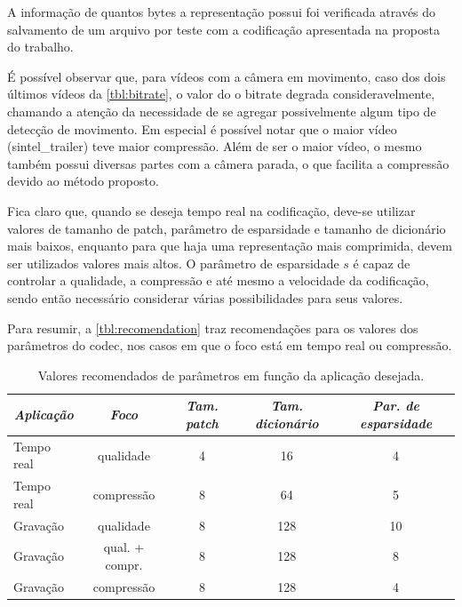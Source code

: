 \documentclass[cic,tc]{iiufrgs}
\begin{document}
A informação de quantos bytes a representação possui foi verificada através do salvamento
de um arquivo por teste com a codificação apresentada na proposta do trabalho.

É possível observar que, para vídeos com a câmera em movimento, caso dos dois últimos vídeos da \autoref{tbl:bitrate}, 
o valor do
o bitrate degrada consideravelmente, chamando a atenção da necessidade de se agregar possivelmente
algum tipo de detecção de movimento.
Em especial é possível notar que o maior vídeo (sintel\_trailer) teve maior compressão.
Além de ser o maior vídeo, o mesmo também possui diversas partes com a câmera parada, 
o que facilita a compressão devido ao método proposto.

Fica claro que, quando se deseja tempo real na codificação, deve-se utilizar valores 
de tamanho de patch, parâmetro de esparsidade e tamanho de dicionário mais baixos, enquanto para 
que haja uma representação mais comprimida, 
devem ser utilizados valores mais altos.
O parâmetro de esparsidade $s$ é capaz de controlar a qualidade, a compressão e até mesmo a velocidade 
da codificação, sendo então necessário considerar várias possibilidades para seus valores.

Para resumir, a \autoref{tbl:recomendation} traz recomendações para os valores dos parâmetros do codec, 
nos casos em que o foco está em tempo real ou compressão.

\begin{table}[h]
    \caption{Valores recomendados de parâmetros em função da aplicação desejada.}
    \centering
    \begin{tabular}{|l|c|c|c|c|}
        \hline
        \multicolumn{1}{|c|}{\emph{Aplicação}} & 
        \emph{Foco} & 
        \emph{Tam. patch} & 
        \emph{Tam. dicionário} & 
        \emph{Par. de esparsidade} \\
        \hline
        Tempo real & qualidade & 4 & 16 & 4 \\
        Tempo real & compressão & 8 & 64 & 5 \\
        Gravação & qualidade & 8 & 128 & 10 \\
        Gravação & qual. + compr. & 8 & 128 & 8 \\
        Gravação & compressão & 8 & 128 & 4 \\
        \hline
    \end{tabular}
    \label{tbl:recomendation}
\end{table}
\end{document}
